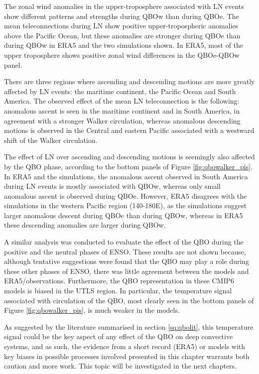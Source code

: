The zonal wind anomalies in the upper-troposphere associated with LN events show different patterns and strengths during QBOw than during QBOe. The mean teleconnections during LN show positive upper-tropospheric anomalies above the Pacific Ocean,  but these anomalies are stronger during QBOe than during QBOw in ERA5 and the two simulations shown. In ERA5, most of the upper troposphere shows positive zonal wind differences in the QBOe-QBOw panel. 

There are three regions where ascending and descending motions are more greatly affected by LN events: the maritime continent, the Pacific Ocean and South America. The observed effect of the mean LN teleconnection is the following: anomalous ascent is seen in the maritime continent and in South America, in agreement with a stronger Walker circulation, whereas anomalous descending motions is observed in the Central and eastern Pacific associated with a westward shift of the Walker circulation. 


The effect of LN over ascending and descending motions is seemingly also affected by the QBO phase, according to the bottom panels of Figure \ref{fig:qbowalker_pis}. In ERA5 and the simulations, the anomalous ascent observed in South America during LN events is mostly associated with QBOw, whereas only small anomalous ascent is observed during QBOe. 
However, ERA5 disagrees with the simulations in the western Pacific region (140-180E), as the simulations suggest larger anomalous descent during QBOe than during QBOw, whereas in ERA5 these descending anomalies are larger during QBOw. 

A similar analysis was conducted to evaluate the effect of the QBO during the positive and the neutral phases of ENSO. These results are not shown because, although tentative suggestions were found that the QBO may play a role during these other phases of ENSO, there was little agreement between the models and ERA5/observations. Furthermore, the QBO representation in these CMIP6 models is biased in the UTLS region. In particular, the temperature signal associated with circulation of the QBO, most clearly seen in the bottom panels of Figure \ref{fig:qbowalker_pis}, is much weaker in the models. 

As suggested by the literature summarised in section \ref{sq:qbolit}, this temperature signal could be the key aspect of any effect of the QBO on deep convective systems, and as such, the evidence from a short record (ERA5) or models with key biases in possible processes involved presented in this chapter warrants both caution and more work. 
This topic will be investigated in the next chapters.


